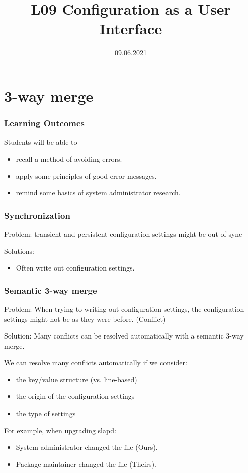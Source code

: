 

\title{L09 Configuration as a User Interface}
\date{09.06.2021}




\section{3-way merge}


\begin{frame}
	\frametitle{Learning Outcomes}
	Students will be able to
	\begin{itemize}
	\item recall a method of avoiding errors.
	\item apply some principles of good error messages.
	\item remind some basics of system administrator research.
	\end{itemize}
\end{frame}


\begin{frame}
	\frametitle{Synchronization}

	Problem: transient and persistent configuration settings might be out-of-sync~\cite{jin2014configurations}

	\pause


	\pause

	Solutions:
	\begin{itemize}
	\item Often write out configuration settings.
	\end{itemize}
\end{frame}

\begin{frame}
	\frametitle{Semantic 3-way merge}

	Problem: When trying to writing out configuration settings, the configuration settings might not be as they were before. (Conflict)

	\pause

	Solution: Many conflicts can be resolved automatically with a semantic 3-way merge.

	\pause

	We can resolve many conflicts automatically if we consider:
	\begin{itemize}[<+-| alert@+>]
	\item the key/value structure (vs. line-based)
	\item the origin of the configuration settings
	\item the type of settings
	\end{itemize}

	\pause[\thebeamerpauses]

	For example, when upgrading slapd:
	\begin{itemize}
	\item System administrator changed the file (Ours).
	\item Package maintainer changed the file (Theirs).
	\end{itemize}
\end{frame}

